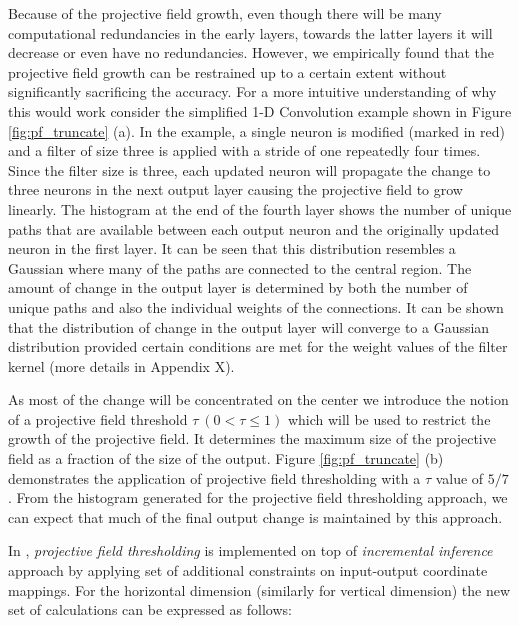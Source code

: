 Because of the projective field growth, even though there will be many computational redundancies in the early layers, towards the latter layers it will decrease or even have no redundancies.
However, we empirically found that the projective field growth can be restrained up to a certain extent without significantly sacrificing the accuracy.
For a more intuitive understanding of why this would work consider the simplified 1-D Convolution example shown in Figure \ref{fig:pf_truncate} (a).
In the example, a single neuron is modified (marked in red) and a filter of size three is applied with a stride of one repeatedly four times.
Since the filter size is three, each updated neuron will propagate the change to three neurons in the next output layer causing the projective field to grow linearly.
The histogram at the end of the fourth layer shows the number of unique paths that are available between each output neuron and the originally updated neuron in the first layer.
It can be seen that this distribution resembles a Gaussian where many of the paths are connected to the central region.
The amount of change in the output layer is determined by both the number of unique paths and also the individual weights of the connections.
It can be shown that the distribution of change in the output layer will converge to a Gaussian distribution provided certain conditions are met for the weight values of the filter kernel (more details in Appendix X).

As most of the change will be concentrated on the center we introduce the notion of a projective field threshold $\tau ~ (0 < \tau \leq 1)$ which will be used to restrict the growth of the projective field.
It determines the maximum size of the projective field as a fraction of the size of the output.
Figure \ref{fig:pf_truncate} (b) demonstrates the application of projective field thresholding with a $\tau$ value of $5/7$.
From the histogram generated for the projective field thresholding approach, we can expect that much of the final output change is maintained by this approach.

In \system, \textit{projective field thresholding} is implemented on top of \textit{incremental inference} approach by applying set of additional constraints on input-output coordinate mappings. For the horizontal dimension (similarly for vertical dimension) the new set of calculations can be expressed as follows:

